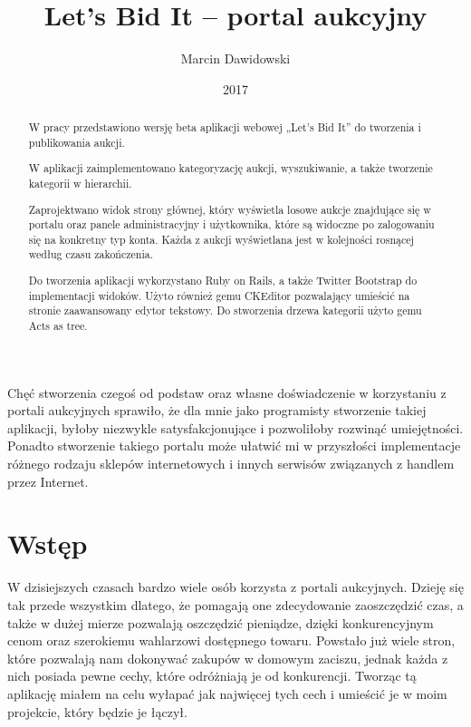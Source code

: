 \documentclass[brudnopis]{xmgr}
\author   {Marcin Dawidowski}
\title    {Let’s Bid It – portal aukcyjny}
\date     {2017}
\begin{document}
\begin{abstract}
  W pracy przedstawiono wersję beta aplikacji webowej „Let's Bid It” do tworzenia i publikowania aukcji.
  
  W aplikacji zaimplementowano kategoryzację aukcji, wyszukiwanie, a także tworzenie kategorii w hierarchii.

  Zaprojektwano widok strony głównej, który wyświetla losowe aukcje znajdujące się w portalu oraz panele administracyjny i użytkownika, które są widoczne po zalogowaniu się na konkretny typ konta. Każda z aukcji wyświetlana jest w kolejności rosnącej według czasu zakończenia.

  Do tworzenia aplikacji wykorzystano Ruby on Rails, a także Twitter Bootstrap do implementacji widoków. Użyto również gemu CKEditor pozwalający umieścić na stronie zaawansowany edytor tekstowy. Do stworzenia drzewa kategorii użyto gemu Acts as tree.

\end{abstract}


\maketitle

\introduction

Chęć stworzenia czegoś od podstaw oraz własne doświadczenie w korzystaniu z portali aukcyjnych sprawiło, że dla mnie jako programisty stworzenie takiej aplikacji, byłoby niezwykle satysfakcjonujące i pozwoliłoby rozwinąć umiejętności. Ponadto stworzenie takiego portalu może ułatwić mi w przyszłości implementacje różnego rodzaju sklepów internetowych i innych serwisów związanych z handlem przez Internet.


\chapter{Wstęp}

W dzisiejszych czasach bardzo wiele osób korzysta z portali aukcyjnych. 
Dzieję się tak przede wszystkim dlatego, że pomagają one zdecydowanie
zaoszczędzić czas, a także w dużej mierze pozwalają oszczędzić 
pieniądze, dzięki konkurencyjnym cenom oraz szerokiemu wahlarzowi dostępnego
towaru. Powstało już wiele stron, które pozwalają nam dokonywać zakupów w 
domowym zaciszu, jednak każda z nich posiada pewne cechy, które odróżniają
je od konkurencji. Tworząc tą aplikację miałem na celu wyłapać jak najwięcej 
tych cech i umieścić je w moim projekcie, który będzie je łączył.
\end{document}

